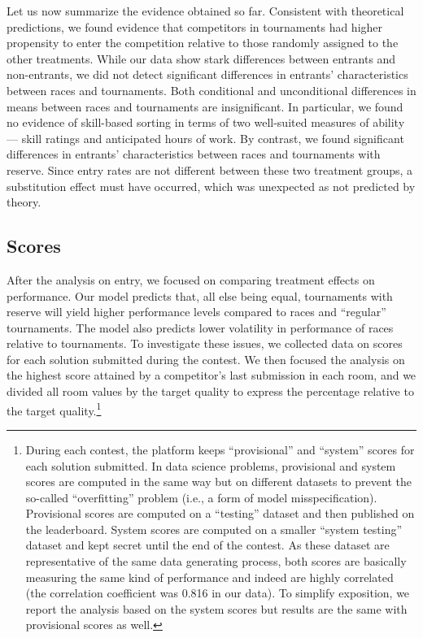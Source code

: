 \documentclass[10pt, titlepage]{article}
\begin{document}
Let us now summarize the evidence obtained so far. Consistent with
theoretical predictions, we found evidence that competitors in
tournaments had higher propensity to enter the competition relative to
those randomly assigned to the other treatments. While our data show
stark differences between entrants and non-entrants, we did not detect
significant differences in entrants' characteristics between races and
tournaments. Both conditional and unconditional differences in means
between races and tournaments are insignificant. In particular, we found
no evidence of skill-based sorting in terms of two well-suited measures
of ability --- skill ratings and anticipated hours of work. By contrast,
we found significant differences in entrants' characteristics between
races and tournaments with reserve. Since entry rates are not different
between these two treatment groups, a substitution effect must have
occurred, which was unexpected as not predicted by theory.

\subsection{Scores}\label{scores}

After the analysis on entry, we focused on comparing treatment effects
on performance. Our model predicts that, all else being equal,
tournaments with reserve will yield higher performance levels compared
to races and ``regular'' tournaments. The model also predicts lower
volatility in performance of races relative to tournaments. To
investigate these issues, we collected data on scores for each solution
submitted during the contest. We then focused the analysis on the
highest score attained by a competitor's last submission in each room,
and we divided all room values by the target quality to express the
percentage relative to the target quality.\footnote{During each contest,
  the platform keeps ``provisional'' and ``system'' scores for each
  solution submitted. In data science problems, provisional and system
  scores are computed in the same way but on different datasets to
  prevent the so-called ``overfitting'' problem (i.e., a form of model
  misspecification). Provisional scores are computed on a ``testing''
  dataset and then published on the leaderboard. System scores are
  computed on a smaller ``system testing'' dataset and kept secret until
  the end of the contest. As these dataset are representative of the
  same data generating process, both scores are basically measuring the
  same kind of performance and indeed are highly correlated (the
  correlation coefficient was 0.816 in our data). To simplify
  exposition, we report the analysis based on the system scores but
  results are the same with provisional scores as well.}
\end{document}
